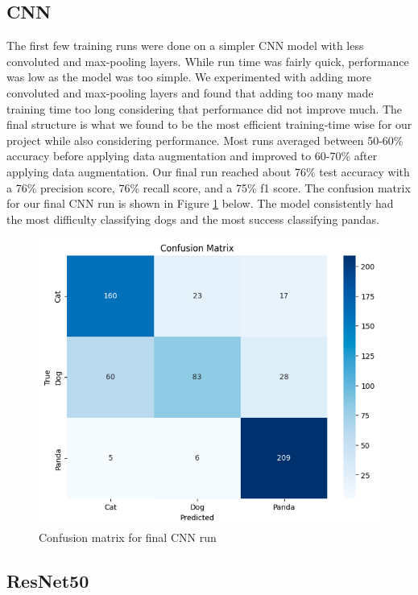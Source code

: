 \subsection{CNN}
The first few training runs were done on a simpler CNN model with less convoluted and max-pooling layers. 
While run time was fairly quick, performance was low as the model was too simple. 
We experimented with adding more convoluted and max-pooling layers and found that adding too many made training time too long considering that performance did not improve much. 
The final structure is what we found to be the most efficient training-time wise for our project while also considering performance. 
Most runs averaged between 50-60\% accuracy before applying data augmentation and improved to 60-70\% after applying data augmentation. 
Our final run reached about 76\% test accuracy with a 76\% precision score, 76\% recall score, and a 75\% f1 score. 
The confusion matrix for our final CNN run is shown in Figure \ref{fig:figure8} below.
The model consistently had the most difficulty classifying dogs and the most success classifying pandas.

\begin{figure}[h]
	\centering
	\includegraphics[scale=0.4]{CNN_cfm}
	\caption{Confusion matrix for final CNN run}
	\label{fig:figure8}
\end{figure}

\subsection{ResNet50}

